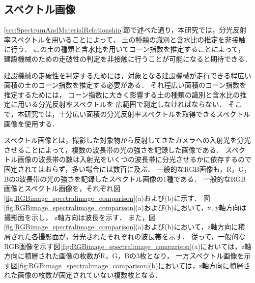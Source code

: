 \subsection{スペクトル画像}
\label{ssec:SpectralImage}

\ref{sec:SpectrumAndMaterialRelationship}節で述べた通り，本研究では，分光反射率スペクトルを用いることによって，
土の種類の識別と含水比の推定を非接触に行う．
この土の種類と含水比を用いてコーン指数を推定することによって，建設機械のための走破性の判定を非接触に行うことが可能になると期待できる．

建設機械の走破性を判定するためには，対象となる建設機械が走行できる程広い面積の土のコーン指数を推定する必要がある．
それ程広い面積のコーン指数を推定するためには，
コーン指数に大きく影響する土の種類の識別と含水比の推定に用いる分光反射率スペクトルを
広範囲で測定しなければならない．
そこで，本研究では，十分広い面積の分光反射率スペクトルを取得できるスペクトル画像を使用する\cite{蔦2002}\cite{長田2004}\cite{田代2013}．

スペクトル画像とは，撮影した対象物から反射してきたカメラへの入射光を分光させることによって，複数の波長帯の光の強さを記録した画像である\cite{中野1996}\cite{眞鍋1996}\cite{Tominaga1999}．
スペクトル画像の波長帯の数は入射光をいくつの波長帯に分光させるかに依存するので固定されてはおらず，多い場合には数百に及ぶ\cite{Goetz1985}．%
一般的なRGB画像も，R，G，Bの3波長帯の光の強さを記録したスペクトル画像の1種である．
一般的なRGB画像とスペクトル画像を，それぞれ図\ref{fig:RGBimage_spectralimage_comparison}(a)および(b)に示す．
図\ref{fig:RGBimage_spectralimage_comparison}(a)および(b)において，x, y軸方向は撮影面を示し，
z軸方向は波長を示す．
また，図\ref{fig:RGBimage_spectralimage_comparison}(a)および(b)において，z軸方向に積層された各撮影面が，分光されたそれぞれの波長帯を示す．
従って，一般的なRGB画像を示す図\ref{fig:RGBimage_spectralimage_comparison}(a)においては，z軸方向に積層された画像の枚数がR，G，Bの3枚となり，
一方スペクトル画像を示す図\ref{fig:RGBimage_spectralimage_comparison}(b)においては，z軸方向に積層された画像の枚数が固定されていない複数枚となる．


